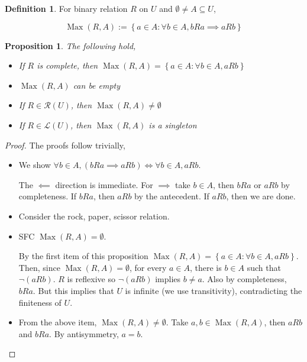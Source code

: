 \documentclass{book}
\theoremstyle{plain}
\newtheorem{proposition}[theorem]{Proposition}
\theoremstyle{definition}
\newtheorem{definition}[theorem]{Definition}
\theoremstyle{remark}
\newcommand{\set}[1]{\left\{#1\right\}}
\begin{document}
\begin{definition}
    For binary relation $R$ on $U$ and 
    $\emptyset \neq A \subseteq U$, 


    \[\operatorname{Max}(R, A) := \set{a \in A : \forall b \in A, b R a \implies a R b}\]

\end{definition}
\begin{proposition}
    The following hold,
    \begin{itemize}
        \item If $R$ is complete, then $\operatorname{Max}(R, A) = \set{a \in A : \forall b \in A, a R b}$
        \item $\operatorname{Max}(R, A)$ can be empty
        \item If $R \in \mathcal{R}(U)$, then $\operatorname{Max}(R, A) \neq \emptyset$
        \item If $R \in \mathcal{L}(U)$, then $\operatorname{Max}(R, A)$ is a singleton
    \end{itemize}
\end{proposition}
\begin{proof}
    The proofs follow trivially,
    \begin{itemize}
        \item We show 
        $\forall b \in A, (bRa \implies aRb) \iff \forall b \in A, aRb$.

        The $\impliedby$ direction is immediate. For $\implies$ take 
        $b \in A$, then $bRa$ or $aRb$ by completeness. If $bRa$, then $aRb$ by the antecedent. If $aRb$, then we are done.

        \item Consider the rock, paper, scissor relation.
        
        \item SFC $\operatorname{Max}(R, A) = \emptyset$.
        
        By the first item of this proposition 
        $\operatorname{Max}(R, A) = \set{a \in A : \forall b \in A, a R b}$.
        Then, since $\operatorname{Max}(R, A) = \emptyset$,
        for every $a \in A$, there is $b \in A$ such that $\lnot (a R b)$.
        $R$ is reflexive so $\lnot (a R b)$ implies $b \neq a$.
        Also by completeness, $b R a$. But this implies that 
        $U$ is infinite (we use transitivity), contradicting the finiteness of $U$.

        \item From the above item, 
        $\operatorname{Max}(R, A) \neq \emptyset$.
        Take $a, b \in \operatorname{Max}(R, A)$, then $a R b$ and $b R a$.
        By antisymmetry, $a = b$.
    \end{itemize}
\end{proof}
\end{document}
